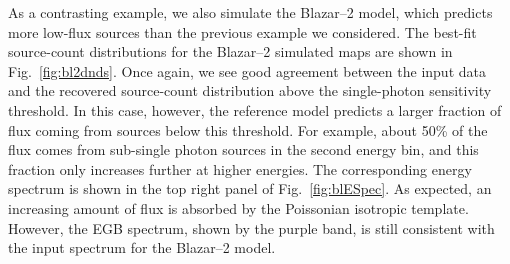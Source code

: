 As a contrasting example, we also simulate the Blazar--2 model, which predicts more low-flux sources than the previous example we considered.  The best-fit source-count distributions for the Blazar--2 simulated maps are shown in Fig.~\ref{fig:bl2dnds}. Once again, we see good agreement between the input data and the recovered source-count distribution above the single-photon sensitivity threshold. In this case, however, the reference model predicts a larger fraction of flux coming from sources below this threshold.  For example, about 50\% of the flux comes from sub-single photon sources in the second energy bin, and this fraction only increases further at higher energies.  The corresponding energy spectrum is shown in the top right panel of Fig.~\ref{fig:blESpec}.  As expected, an increasing amount of flux is absorbed by the Poissonian isotropic template.  However, the EGB spectrum, shown by the purple band, is still consistent with the input spectrum for the Blazar--2 model.

